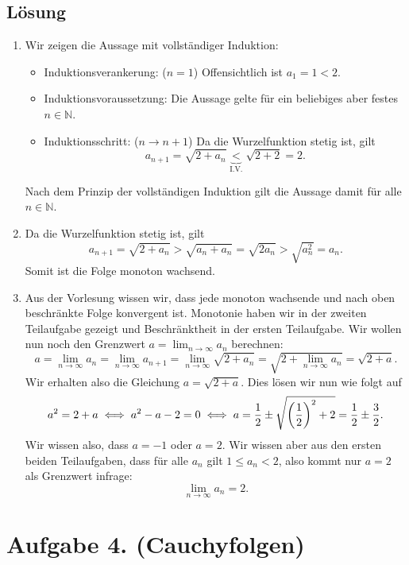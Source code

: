 \documentclass[german,12pt]{homework}
\newcommand{\NN}{\mathbb{N}}
\DeclarePairedDelimiter{\enbrace}{(}{)}
\begin{document}
    \subsection*{Lösung}
    \begin{enumerate}
        \item Wir zeigen die Aussage mit vollständiger Induktion:
        \begin{itemize}
            \item Induktionsverankerung: (\(n = 1\)) Offensichtlich ist \(a_1 =
            1 < 2\).
            \item Induktionsvoraussetzung: Die Aussage gelte für ein beliebiges
            aber festes \(n \in \NN\).
            \item Induktionsschritt: (\(n \to n + 1\)) Da die Wurzelfunktion
            stetig ist, gilt
            \[a_{n + 1} = \sqrt{2 + a_n} \underbrace{<}_\text{I.V.} \sqrt{2 +
            2} = 2.\]
        \end{itemize}
        Nach dem Prinzip der vollständigen Induktion gilt die Aussage damit für
        alle \(n \in \NN\).
        \item Da die Wurzelfunktion stetig ist, gilt
        \[a_{n + 1} = \sqrt{2 + a_n} > \sqrt{a_n + a_n} = \sqrt{2a_n} >
        \sqrt{a_n^2} = a_n.\]
        Somit ist die Folge monoton wachsend.
        \item Aus der Vorlesung wissen wir, dass jede monoton wachsende und
        nach oben beschränkte Folge konvergent ist. Monotonie haben wir in der
        zweiten Teilaufgabe gezeigt und Beschränktheit in der ersten
        Teilaufgabe. Wir wollen nun noch den Grenzwert \(a = \lim_{n \to
        \infty}a_n\) berechnen:
        \[a = \lim_{n \to \infty}a_n = \lim_{n \to \infty}a_{n + 1} = \lim_{n
        \to \infty}\sqrt{2 + a_n} = \sqrt{2 + \lim_{n \to \infty}a_n} = \sqrt{2
        + a}.\]
        Wir erhalten also die Gleichung \(a = \sqrt{2 + a}\). Dies lösen wir
        nun wie folgt auf
        \[a^2 = 2 + a \iff a^2 - a - 2 = 0 \iff a = \frac{1}{2} \pm
        \sqrt{\enbrace*{\frac{1}{2}}^2 + 2} = \frac{1}{2} \pm \frac{3}{2}.\]
        Wir wissen also, dass \(a = -1\) oder \(a = 2\). Wir wissen aber aus
        den ersten beiden Teilaufgaben, dass für alle \(a_n\) gilt \(1 \le a_n
        < 2\), also kommt nur \(a = 2\) als Grenzwert infrage:
        \[\lim_{n \to \infty}a_n = 2.\]
    \end{enumerate}

    \section*{Aufgabe 4. (Cauchyfolgen)}
\end{document}
